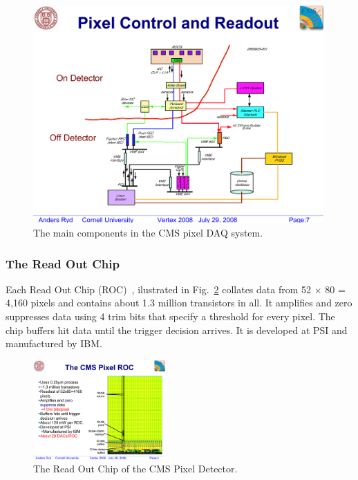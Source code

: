 \begin{figure}[h]
\begin{center}
 \includegraphics[width=0.99\textwidth]{2860506-001}
\end{center}
\caption{The main components in the CMS pixel DAQ system. }
\label{fig:daqcomponents}
\end{figure}

\clearpage

\subsubsection{The Read Out Chip}

Each Read Out Chip (ROC)~\cite{ROC}, ilustrated in Fig.~\ref{fig:ROC} collates data from 52 $\times$ 80 = 4,160 pixels 
and contains about 1.3 million transistors in all.
It amplifies and zero suppresses data using 4 trim bits
that specify a threshold for every pixel. The chip buffers hit data
until the trigger decision arrives. It is developed at PSI and manufactured by IBM.

\begin{figure}[h]
\begin{center}
 \includegraphics[width=0.45\textwidth]{ROC.pdf}
\end{center}
\caption{The Read Out Chip of the CMS Pixel Detector.}
\label{fig:ROC}
\end{figure}

